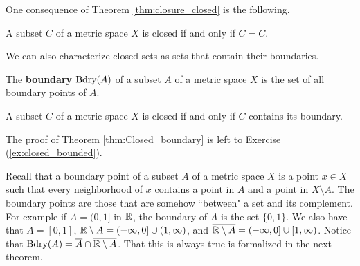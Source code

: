 \begin{comment}

\ActivitySolution

\ba
\item We need to prove that any closed subset of $X$ that contains $A$ also contains $\overline{A}$.

\item Since $\overline{A} = A \cup A'$ and $A \subseteq C$, to show that $\overline{A} \subseteq C$ we only need to demonstrate that $A' \subseteq C$. 

\item Let $N$ be a neighborhood of $x$. Then $N$ contains a point of $A$ different than $x$.

\item Since $A \subseteq C$, it follows that $N$ contains a point of $C$ different than $x$. So $x$ is a limit point of $C$. The fact that $C$ is closed means that $C$ contains its limit points, so $x \in C$. Therefore, $A' \subseteq C$ and $\overline{A} \subseteq C$. 


\ea

\end{comment}

One consequence of Theorem \ref{thm:closure_closed} is the following.

\begin{corollary} A subset $C$ of a metric space $X$ is closed if and only if $C = \overline{C}$. 
\end{corollary}
 
We can also characterize closed sets as sets that contain their boundaries.

\begin{definition} The \textbf{boundary} $\text{Bdry}(A)$ of a subset $A$ of a metric space $X$ is the set of all boundary points of $A$.
\end{definition}

\begin{theorem} \label{thm:Closed_boundary} A subset $C$ of a metric space $X$ is closed if and only if $C$ contains its boundary. 
\end{theorem}

The proof of Theorem \ref{thm:Closed_boundary} is left to Exercise (\ref{ex:closed_bounded}).

Recall that a boundary point of a subset $A$ of a metric space $X$ is a point $x \in X$ such that every neighborhood of $x$ contains a point in $A$ and a point in $X \setminus A$. The boundary points are those that are somehow ``between" a set and its complement. For example if $A = (0,1]$ in $\mathbb{R}$, the boundary of $A$ is the set $\{0,1\}$. We also have that $\overline{A} = [0,1]$, $\mathbb{R} \setminus A = (-\infty, 0] \cup (1, \infty)$, and $\overline{\mathbb{R} \setminus A} = (-\infty, 0] \cup [1, \infty)$. Notice that $\text{Bdry}(A) = \overline{A}  \cap \overline{\mathbb{R} \setminus A}$. That this is always true is formalized in the next theorem.

